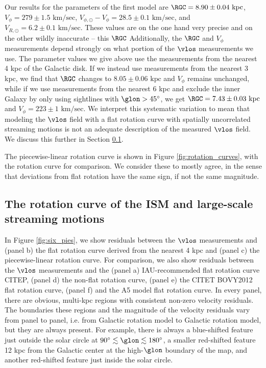 Our results for the parameters of the first model are $\RGC=8.90 \pm 0.04 \text{ kpc}$, $V_\phi = 279 \pm 1.5 \text{ km/sec}$, $V_{\phi, \odot} - V_\phi = 28.5 \pm 0.1 \text{ km/sec}$, and $V_{R, \odot} = 6.2 \pm 0.1 \text{ km/sec}$.
These values are on the one hand very precise and on the other wildly inaccurate -- this $\RGC$ 
Additionally, the $\RGC$ and $V_\phi$ measurements depend strongly on what portion of the $\vlos$ measurements we use. 
The parameter values we give above use the measurements from the nearest 4 kpc of the Galactic disk.
If we instead use measurements from the nearest 3 kpc, we find that $\RGC$ changes to $8.05 \pm 0.06 \text{ kpc}$ and $V_\phi$ remains unchanged, while if we use measurements from the nearest 6 kpc and exclude the inner Galaxy by only using sightlines with $\glon > 45^\circ$, we get $\RGC = 7.43 \pm 0.03 \text{ kpc}$ and $V_\phi = 223 \pm 1 \text{ km/sec}$.
We interpret this systematic variation to mean that modeling the $\vlos$ field with a flat rotation curve with spatially uncorrelated streaming motions is not an adequate description of the measured $\vlos$ field. 
We discuss this further in Section \ref{sec:rotation_discussion}.

The piecewise-linear rotation curve is shown in Figure \ref{fig:rotation_curves}, with the \Clemens rotation curve for comparison. 
We consider these to mostly agree, in the sense that deviations from flat rotation have the same sign, if not the same magnitude. 

\subsection{The rotation curve of the ISM and large-scale streaming motions}
\label{sec:rotation_discussion}
In Figure \ref{fig:six_pies}, we show residuals between the $\vlos$ measurements and (panel b) the flat rotation curve derived from the nearest 4 kpc and (panel c) the piecewise-linear rotation curve. 
For comparison, we also show residuals between the $\vlos$ measurements and the (panel a) IAU-recommended flat rotation curve CITEP, (panel d) the \Clemens non-flat rotation curve, (panel e) the CITET BOVY2012 flat rotation curve, (panel f) and the \Reid A5 model flat rotation curve. 
In every panel, there are obvious, multi-kpc regions with consistent non-zero velocity residuals.
The boundaries these regions and the magnitude of the velocity residuals vary from panel to panel, i.e. from Galactic rotation model to Galactic rotation model, but they are always present.
For example, there is always a blue-shifted feature just outside the solar circle at $90^\circ \lesssim \glon \lesssim 180^\circ$, a smaller red-shifted feature 12 kpc from the Galactic center at the high-$\glon$ boundary of the map, and another red-shifted feature just inside the solar circle. 

